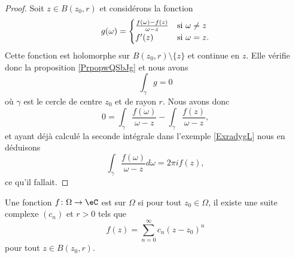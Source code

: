 \begin{proof}
    Soit \( z\in B(z_0,r)\) et considérons la fonction
    \begin{equation}
        g(\omega)=\begin{cases}
            \frac{ f(\omega)-f(z) }{ \omega-z }    &   \text{si \( \omega\neq z\)}\\
            f'(z)    &    \text{si \( \omega=z\)}.
        \end{cases}
    \end{equation}
    Cette fonction est holomorphe sur \( B(z_0,r)\setminus\{ z \}\) et continue en \( z\). Elle vérifie donc la proposition \ref{PrpopwQSbJg} et nous avons
    \begin{equation}
        \int_{\gamma}g=0
    \end{equation}
    où \( \gamma\) est le cercle de centre \( z_0\) et de rayon \( r\). Nous avons donc
    \begin{equation}
        0=\int_{\gamma}\frac{ f(\omega) }{ \omega-z }-\int_{\gamma}\frac{ f(z) }{ \omega-z },
    \end{equation}
    et ayant déjà calculé la seconde intégrale dans l'exemple \ref{ExradygL} nous en déduisons
    \begin{equation}
        \int_{\gamma}\frac{ f(\omega) }{ \omega-z }d\omega=2\pi if(z),
    \end{equation}
    ce qu'il fallait.
\end{proof}

\begin{definition}
    Une fonction \( f\colon \Omega\to \eC\) est  sur \( \Omega\) si pour tout \( z_0\in\Omega\), il existe une suite complexe \( (c_n)\) et \( r>0\) tels que
    \begin{equation}
        f(z)=\sum_{n=0}^{\infty} c_n(z-z_0)^n
    \end{equation}
    pour tout \( z\in B(z_0,r)\).
\end{definition}

